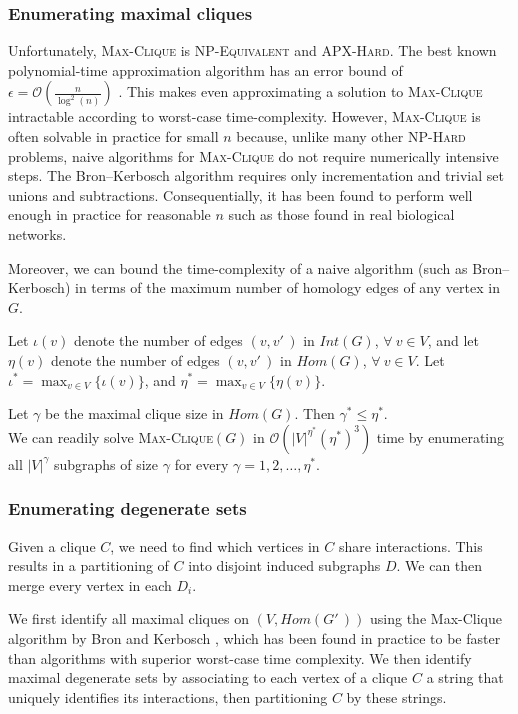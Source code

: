 \documentclass[12pt,twoside]{article}
\begin{document}
\subsubsection{Enumerating maximal cliques}

Unfortunately, \textsc{Max-Clique} is \textsc{NP-Equivalent} and \textsc{APX-Hard}. The best known polynomial-time approximation algorithm has an error bound of $\epsilon = \mathcal O \left(\frac{n}{\log^2(n)}\right)$ \cite{boppana}. This makes even approximating a solution to \textsc{Max-Clique} intractable according to worst-case time-complexity. However, \textsc{Max-Clique} is often solvable in practice for small $n$ because, unlike many other \textsc{NP-Hard} problems, naive algorithms for \textsc{Max-Clique} do not require numerically intensive steps. The Bron--Kerbosch algorithm requires only incrementation and trivial set unions and subtractions. Consequentially, it has been found to perform well enough in practice for reasonable $n$ such as those found in real biological networks.

Moreover, we can bound the time-complexity of a naive algorithm (such as Bron--Kerbosch) in terms of the maximum number of homology edges of any vertex in $G$.

Let $\iota(v)$ denote the number of edges $(v, v'\,\!)$ in $Int(G)$, $\forall \: v \in V$, and let $\eta(v)$ denote the number of edges $(v, v'\,\!)$ in $Hom(G)$, $\forall \: v \in V$. Let $\iota^* = \displaystyle \max_{v \in V}\{\iota(v)\}$, and $\eta^* = \displaystyle \max_{v \in V}\{\eta(v)\}$.

Let $\gamma$ be the maximal clique size in $Hom(G)$. Then $\gamma^* \leq \eta^*$.\\
We can readily solve \textsc{Max-Clique}$(G)$ in $\mathcal O(|V|^{\eta^*}(\eta^*)^3)$ time by enumerating all $|V|^{\gamma}$ subgraphs of size $\gamma$ for every $\gamma = 1, 2, \ldots, \eta^*$.

\subsubsection{Enumerating degenerate sets}

Given a clique $C$, we need to find which vertices in $C$ share interactions. This results in a partitioning of $C$ into disjoint induced subgraphs $D$. We can then merge every vertex in each $D_i$.

We first identify all maximal cliques on $(V,Hom(G'\,\!))$ using the {Max-Clique} algorithm by Bron and Kerbosch \cite{bron}, which has been found in practice to be faster than algorithms with superior worst-case time complexity. We then identify maximal degenerate sets by associating to each vertex of a clique $C$ a string that uniquely identifies its interactions, then partitioning $C$ by these strings.
\end{document}
